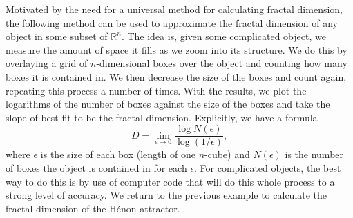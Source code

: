 Motivated by the need for a universal method for calculating fractal dimension, the following method can be used to approximate the fractal dimension of any object in some subset of $\mathbb{R}^n$. The idea is, given some complicated object, we measure the amount of space it fills as we zoom into its structure. We do this by overlaying a grid of $n$-dimensional boxes over the object and counting how many boxes it is contained in. We then decrease the size of the boxes and count again, repeating this process a number of times. With the results, we plot the logarithms of the number of boxes against the size of the boxes and take the slope of best fit to be the fractal dimension. Explicitly, we have a formula
$$D = \lim_{\epsilon \to 0} \frac{\log N(\epsilon)}{\log(1/\epsilon)},$$
where $\epsilon$ is the size of each box (length of one $n$-cube) and $N(\epsilon)$ is the number of boxes the object is contained in for each $\epsilon$. For complicated objects, the best way to do this is by use of computer code that will do this whole process to a strong level of accuracy. We return to the previous example to calculate the fractal dimension of the Hénon attractor.

